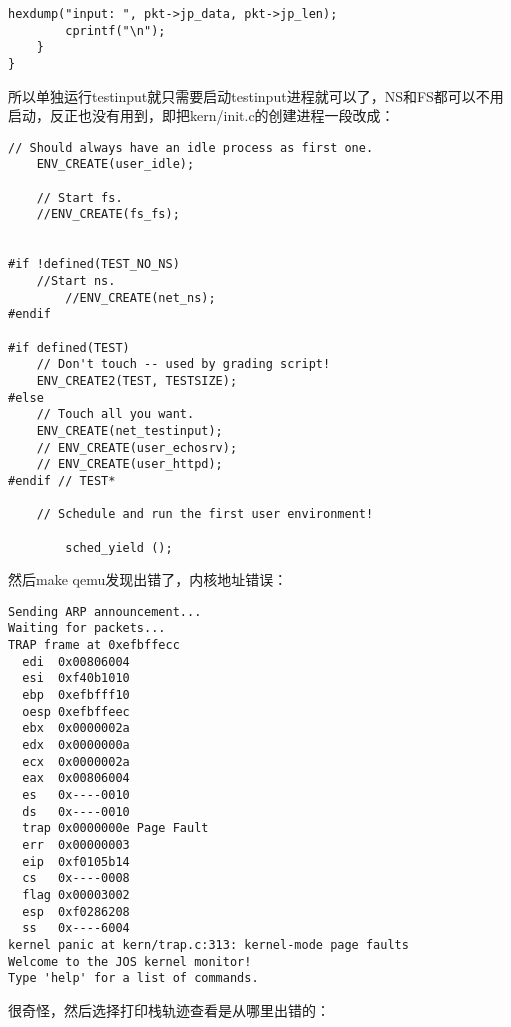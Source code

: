 \documentclass{article}
\begin{document}
\begin{CJK*}{UTF8}{gkai}
\begin{lstlisting}[style=ccode, title={\scriptsize \ttfamily \bfseries kern/e100.c}]
		hexdump("input: ", pkt->jp_data, pkt->jp_len);
		cprintf("\n");
	}
}
\end{lstlisting}

所以单独运行testinput就只需要启动testinput进程就可以了，NS和FS都可以不用启动，反正也没有用到，即把kern/init.c的创建进程一段改成：

\begin{lstlisting}[style=ccode, title={\scriptsize \ttfamily \bfseries kern/init.c: i386\_init()}]
	// Should always have an idle process as first one.
	ENV_CREATE(user_idle);

	// Start fs.
	//ENV_CREATE(fs_fs);


#if !defined(TEST_NO_NS)
	//Start ns.
        //ENV_CREATE(net_ns);
#endif

#if defined(TEST)
	// Don't touch -- used by grading script!
	ENV_CREATE2(TEST, TESTSIZE);
#else
	// Touch all you want.
	ENV_CREATE(net_testinput);
	// ENV_CREATE(user_echosrv);
	// ENV_CREATE(user_httpd);
#endif // TEST*

	// Schedule and run the first user environment!

        sched_yield ();
\end{lstlisting}

然后make qemu发现出错了，内核地址错误：

\begin{lstlisting}[style=console]
Sending ARP announcement...
Waiting for packets...
TRAP frame at 0xefbffecc
  edi  0x00806004
  esi  0xf40b1010
  ebp  0xefbfff10
  oesp 0xefbffeec
  ebx  0x0000002a
  edx  0x0000000a
  ecx  0x0000002a
  eax  0x00806004
  es   0x----0010
  ds   0x----0010
  trap 0x0000000e Page Fault
  err  0x00000003
  eip  0xf0105b14
  cs   0x----0008
  flag 0x00003002
  esp  0xf0286208
  ss   0x----6004
kernel panic at kern/trap.c:313: kernel-mode page faults
Welcome to the JOS kernel monitor!
Type 'help' for a list of commands.
\end{lstlisting}

很奇怪，然后选择打印栈轨迹查看是从哪里出错的：


\end{CJK*}
\end{document}
